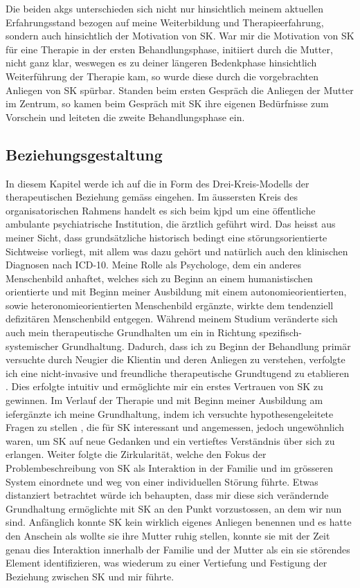 Die beiden \acp{akg} unterschieden sich nicht nur hinsichtlich meinem aktuellen Erfahrungsstand bezogen auf meine Weiterbildung und Therapieerfahrung, sondern auch hinsichtlich der Motivation von SK. War mir die Motivation von SK für eine Therapie in der ersten Behandlungsphase, initiiert durch die Mutter, nicht ganz klar, weswegen es zu deiner längeren Bedenkphase hinsichtlich Weiterführung der Therapie kam, so wurde diese durch die vorgebrachten Anliegen von SK spürbar. Standen beim ersten Gespräch die Anliegen der Mutter im Zentrum, so kamen beim Gespräch mit SK ihre eigenen Bedürfnisse zum Vorschein und leiteten die zweite Behandlungsphase ein. 


\subsection{Beziehungsgestaltung} \label{lbBeziehungsgestaltung}  
In diesem Kapitel werde ich auf die  in Form des Drei-Kreis-Modells der therapeutischen Beziehung gemäss  eingehen. Im äussersten Kreis des organisatorischen Rahmens handelt es sich beim \ac{kjpd} um eine öffentliche ambulante psychiatrische Institution, die ärztlich geführt wird. Das heisst aus meiner Sicht, dass grundsätzliche historisch bedingt eine störungsorientierte Sichtweise vorliegt, mit allem was dazu gehört und natürlich auch den klinischen Diagnosen nach ICD-10. Meine Rolle als Psychologe, dem ein anderes Menschenbild anhaftet, welches sich zu Beginn an einem humanistischen orientierte und mit Beginn meiner Ausbildung mit einem autonomieorientierten, sowie heteronomieorientierten Menschenbild ergänzte, wirkte dem tendenziell defizitären Menschenbild entgegen. Während meinem Studium veränderte sich auch mein therapeutische Grundhalten um ein in Richtung spezifisch-systemischer Grundhaltung. Dadurch, dass ich zu Beginn der Behandlung primär versuchte durch Neugier die Klientin und deren Anliegen zu verstehen, verfolgte ich eine nicht-invasive und freundliche therapeutische Grundtugend zu etablieren \cite{Cecchin1988}. Dies erfolgte intuitiv und ermöglichte mir ein erstes Vertrauen von SK zu gewinnen. Im Verlauf der Therapie und mit Beginn meiner Ausbildung am \ac{ief}ergänzte ich meine Grundhaltung, indem ich versuchte hypothesengeleitete Fragen zu stellen \cite{Andersen1990}, die für SK interessant und angemessen, jedoch ungewöhnlich waren, um SK auf neue Gedanken und ein vertieftes Verständnis über sich zu erlangen. Weiter folgte die Zirkularität, welche den Fokus der Problembeschreibung von SK als Interaktion in der Familie und im grösseren System einordnete und weg von einer individuellen Störung führte. Etwas distanziert betrachtet würde ich behaupten, dass mir diese sich verändernde Grundhaltung ermöglichte mit SK an den Punkt vorzustossen, an dem wir nun sind. Anfänglich konnte SK kein wirklich eigenes Anliegen benennen und es hatte den Anschein als wollte sie ihre Mutter ruhig stellen, konnte sie mit der Zeit genau dies Interaktion innerhalb der Familie und der Mutter als ein sie störendes Element identifizieren, was wiederum zu einer Vertiefung und Festigung der Beziehung zwischen SK und mir führte.

